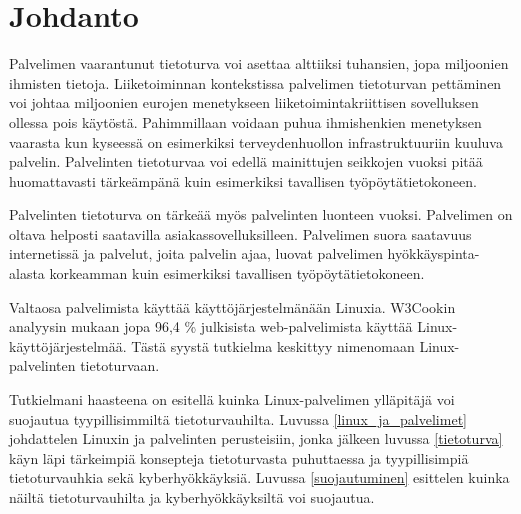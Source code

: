 \chapter{Johdanto}\label{Johdanto}

    Palvelimen vaarantunut tietoturva voi asettaa alttiiksi tuhansien, jopa miljoonien ihmisten tietoja. Liiketoiminnan kontekstissa palvelimen tietoturvan pettäminen voi johtaa miljoonien eurojen menetykseen liiketoimintakriittisen sovelluksen ollessa pois käytöstä. Pahimmillaan voidaan puhua ihmishenkien menetyksen vaarasta kun kyseessä on esimerkiksi terveydenhuollon infrastruktuuriin kuuluva palvelin. Palvelinten tietoturvaa voi edellä mainittujen seikkojen vuoksi pitää huomattavasti tärkeämpänä kuin esimerkiksi tavallisen työpöytätietokoneen.

    Palvelinten tietoturva on tärkeää myös palvelinten luonteen vuoksi. Palvelimen on oltava helposti saatavilla asiakassovelluksilleen. Palvelimen suora saatavuus internetissä ja palvelut, joita palvelin ajaa, luovat palvelimen hyökkäyspinta-alasta korkeamman kuin esimerkiksi tavallisen työpöytätietokoneen.

    Valtaosa palvelimista käyttää käyttöjärjestelmänään Linuxia. W3Cookin analyysin mukaan jopa 96,4 \% julkisista web-palvelimista käyttää Linux-käyttöjärjestelmää\cite{w3cook}. Tästä syystä tutkielma keskittyy nimenomaan Linux-palvelinten tietoturvaan.

    Tutkielmani haasteena on esitellä kuinka Linux-palvelimen ylläpitäjä voi suojautua tyypillisimmiltä tietoturvauhilta. Luvussa \ref{linux_ja_palvelimet} johdattelen Linuxin ja palvelinten perusteisiin, jonka jälkeen luvussa \ref{tietoturva} käyn läpi tärkeimpiä konsepteja tietoturvasta puhuttaessa ja tyypillisimpiä tietoturvauhkia sekä kyberhyökkäyksiä. Luvussa \ref{suojautuminen} esittelen kuinka näiltä tietoturvauhilta ja kyberhyökkäyksiltä voi suojautua.
